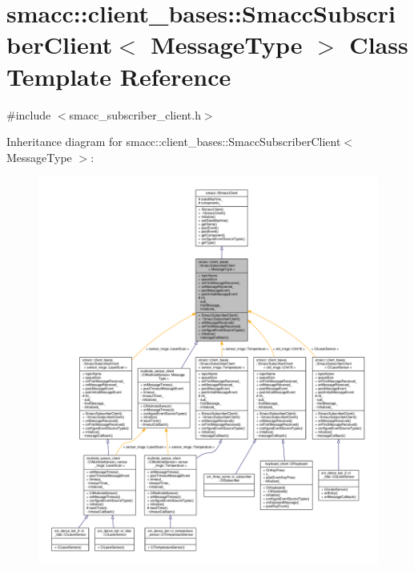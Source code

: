 \hypertarget{classsmacc_1_1client__bases_1_1SmaccSubscriberClient}{}\section{smacc\+:\+:client\+\_\+bases\+:\+:Smacc\+Subscriber\+Client$<$ Message\+Type $>$ Class Template Reference}
\label{classsmacc_1_1client__bases_1_1SmaccSubscriberClient}


{\ttfamily \#include $<$smacc\+\_\+subscriber\+\_\+client.\+h$>$}



Inheritance diagram for smacc\+:\+:client\+\_\+bases\+:\+:Smacc\+Subscriber\+Client$<$ Message\+Type $>$\+:\nopagebreak
\begin{figure}[H]
\begin{center}
\leavevmode
\includegraphics[width=350pt]{classsmacc_1_1client__bases_1_1SmaccSubscriberClient__inherit__graph}
\end{center}
\end{figure}



